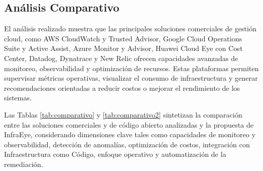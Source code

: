 \subsection{Análisis Comparativo}

El análisis realizado muestra que las principales soluciones comerciales de gestión cloud, como AWS CloudWatch y Trusted Advisor, Google Cloud Operations Suite y Active Assist, Azure Monitor y Advisor, Huawei Cloud Eye con Cost Center, Datadog, Dynatrace y New Relic ofrecen capacidades avanzadas de monitoreo, observabilidad y optimización de recursos. Estas plataformas permiten supervisar métricas operativas, visualizar el consumo de infraestructura y generar recomendaciones orientadas a reducir costos o mejorar el rendimiento de los sistemas.

Las Tablas \ref{tab:comparativo} y \ref{tab:comparativo2} sintetizan la comparación entre las soluciones comerciales y de código abierto analizadas y la propuesta de InfraEye, considerando dimensiones clave tales como capacidades de monitoreo y observabilidad, detección de anomalías, optimización de costos, integración con Infraestructura como Código, enfoque operativo y automatización de la remediación.

